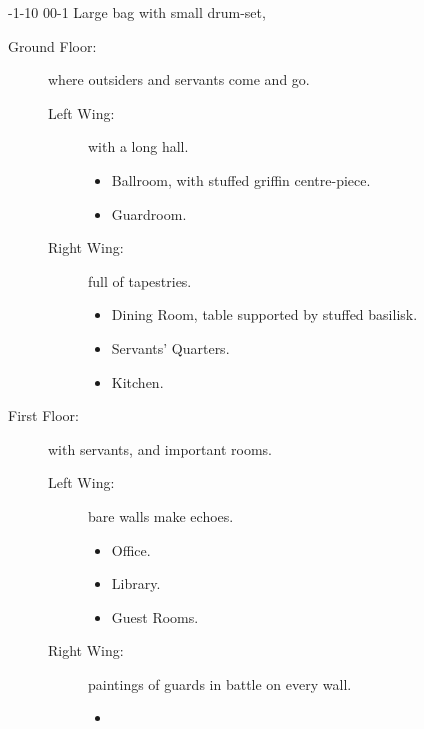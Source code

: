 \begin{multicols}{2}
\townmaster

%
  {{-1}{-1}{0}}%
  {{0}{0}{-1}}%
  {
  }%
  {}%
  {Large bag with small drum-set, \lootJewellery}%
  {}%

\begin{description}
  \item[Ground Floor:]
  where outsiders and servants come and go.
    \begin{description}
      \item[Left Wing:]
      with a long hall.
      \begin{itemize}
        \item
        Ballroom, with stuffed griffin centre-piece.
        \item
        Guardroom.
      \end{itemize}
      \item[Right Wing:]
      full of tapestries.
      \begin{itemize}
        \item
        Dining Room, table supported by stuffed \gls{basilisk}.
        \item
        Servants' Quarters.
        \item
        Kitchen.
      \end{itemize}
    \end{description}
  \item[First Floor:]
  with servants, and important rooms.
    \begin{description}
      \item[Left Wing:]
      bare walls make echoes.
      \begin{itemize}
        \item
        Office.
        \item
        Library.
        \item
        Guest Rooms.
      \end{itemize}
      \item[Right Wing:]
      paintings of \glspl{guard} in battle on every wall.
      \begin{itemize}
        \item

\end{itemize}
\end{description}
\end{description}
\end{multicols}
